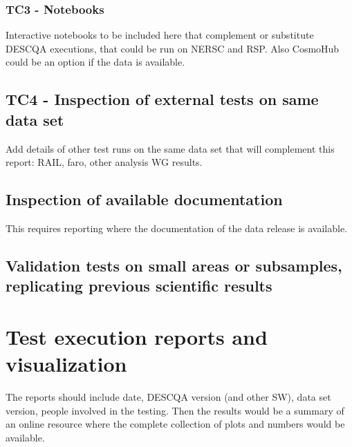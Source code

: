 \documentclass[12pt, a4paper]{article}
\begin{document}
\subsubsection{TC3 - Notebooks}
Interactive notebooks to be included here that complement or substitute DESCQA executions, that could be run on NERSC and RSP. Also CosmoHub could be an option if the data is available.

\subsection{TC4 - Inspection of external tests on same data set}
Add details of other test runs on the same data set that will complement this report: RAIL, faro, other analysis WG results.

\subsection{Inspection of available documentation}
This requires reporting where the documentation of the data release is available.

\subsection{Validation tests on small areas or subsamples, replicating previous scientific results}


\section{Test execution reports and visualization}

The reports should include date, DESCQA version (and other SW), data set version, people involved in the testing. Then the results would be a summary of an online resource where the complete collection of plots and numbers would be available.
\end{document}
